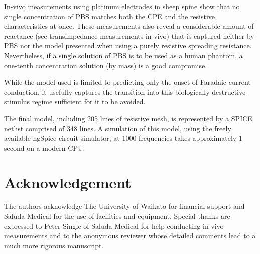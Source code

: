 \documentclass[journal, a4paper]{IEEEtran}
\begin{document}
In-vivo measurements using platinum electrodes in sheep spine show that no single concentration of PBS matches both the CPE and the resistive characteristics at once.
These measurements also reveal a considerable amount of reactance (see transimpedance measurements in vivo) that is captured neither by PBS nor the model presented when using a purely resistive spreading resistance.
Nevertheless, if a single solution of PBS is to be used as a human phantom, a one-tenth concentration solution (by mass) is a good compromise.

While the model used is limited to predicting only the onset of Faradaic current conduction, it usefully captures the transition into this biologically destructive stimulus regime sufficient for it to be avoided. 
    
The final model, including 205 lines of resistive mesh, is represented by a SPICE netlist comprised of 348 lines.
A simulation of this model, using the freely available ngSpice circuit simulator, at 1000 frequencies takes approximately 1 second on a modern CPU.

\section*{Acknowledgement}
The authors acknowledge The University of Waikato for financial support and Saluda Medical for the use of facilities and equipment. Special thanks are expressed to Peter Single of Saluda Medical for help conducting in-vivo measurements and to the anonymous reviewer whose detailed comments lead to a much more rigorous manuscript.
\end{document}
